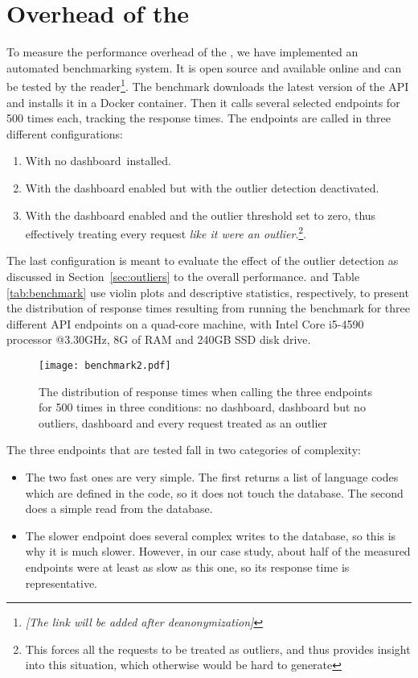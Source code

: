   
\newpage
\section{Overhead of the \tool}
\label{sec:overhead}

To measure the performance overhead of the \tool, we have implemented an automated benchmarking system. It is open source and available online and can be tested by the reader\footnote{\em [The link will be added after deanonymization]}. The benchmark downloads the latest version of the \zee API and installs it in a Docker container. Then it calls several selected endpoints for 500 times each, tracking the response times. The endpoints are called in three different configurations: 

	\begin{enumerate}
		\item With no dashboard installed.
		\item With the dashboard enabled but with the outlier detection deactivated.
		\item With the dashboard enabled and the outlier threshold set to zero, thus effectively treating every request {\em like it were an outlier}.\footnote{This forces all the requests to be treated as outliers, and thus provides insight into this situation, which otherwise would be hard to generate}.
	\end{enumerate}

The last configuration is meant to evaluate the effect of the outlier detection as discussed in Section~\ref{sec:outliers} to the overall performance.
%
 and Table \ref{tab:benchmark} use violin plots and descriptive statistics, respectively, to present the distribution of response times resulting from running the benchmark for three different API endpoints on a quad-core machine, with Intel Core i5-4590 processor @3.30GHz, 8G of RAM and 240GB SSD disk drive.


\begin{figure}[h!]
	\centering
	\texttt{[image: benchmark2.pdf]}
	\caption{The distribution of response times when calling the three endpoints for 500 times in three conditions: no dashboard, dashboard but no outliers, dashboard and every request treated as an outlier}
	\label{fig:bench}
\end{figure}




	The three endpoints that are tested fall in two categories of complexity: 
	\begin{itemize}
		\item The two fast ones are very simple. 
		The first returns a list of language codes which are defined in the code, so it does not touch the \zee database. The second does a simple read from the database. 
		\item The slower endpoint does several complex writes to the database, so this is why it is much slower. However, in our case study, about half of the measured endpoints were at least as slow as this one, so its response time is representative.
	\end{itemize}

